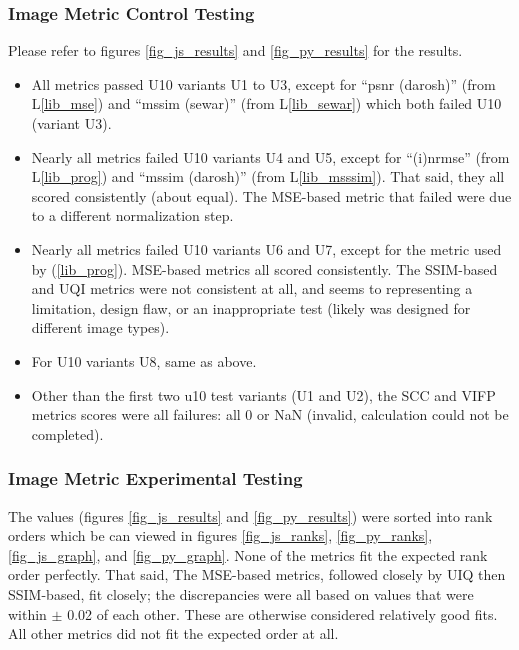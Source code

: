 \documentclass[12pt, titlepage]{article}
\newcommand{\lref}[1]{L\ref{#1}}
\begin{document}
\subsubsection{Image Metric Control Testing}
Please refer to figures \ref{fig_js_results} and \ref{fig_py_results} for the results.
\begin{itemize}
  \item All metrics passed U10 variants U1 to U3,
    except for ``psnr (darosh)'' (from \lref{lib_mse}) and ``mssim (sewar)'' (from \lref{lib_sewar})
    which both failed U10 (variant U3).
  \item Nearly all metrics failed U10 variants U4 and U5,
    except for ``(i)nrmse'' (from \lref{lib_prog}) and ``mssim (darosh)'' (from \lref{lib_msssim}).
    That said, they all scored consistently (about equal).
    The MSE-based metric that failed were due to a different
    normalization step.
  \item Nearly all metrics failed U10 variants U6 and U7,
    except for the metric used by \progname{} (\ref{lib_prog}).
    MSE-based metrics all scored consistently. The SSIM-based and UQI
    metrics were not consistent at all, and seems to representing
    a limitation, design flaw, or an inappropriate test
    (likely was designed for different image types).
  \item For U10 variants U8, same as above.
  \item Other than the first two u10 test variants (U1 and U2),
    the SCC and VIFP metrics scores were all failures:
    all 0 or NaN (invalid, calculation could not be completed).
\end{itemize}


\subsubsection{Image Metric Experimental Testing}
The values (figures \ref{fig_js_results} and \ref{fig_py_results}) were sorted into
rank orders which be can viewed in figures \ref{fig_js_ranks}, \ref{fig_py_ranks},
\ref{fig_js_graph}, and \ref{fig_py_graph}.
None of the metrics fit the expected rank order perfectly. That said,
The MSE-based metrics, followed closely by UIQ then SSIM-based, fit closely; the discrepancies
were all based on values that were within $\pm$ 0.02 of each other. These are otherwise considered
relatively good fits. All other metrics did not fit the expected order at all.
\end{document}
